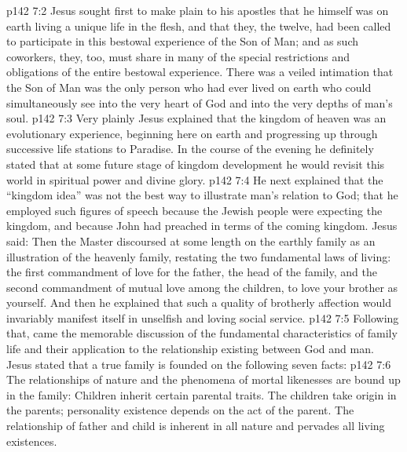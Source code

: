 \vs p142 7:2 Jesus sought first to make plain to his apostles that he himself was on earth living a unique life in the flesh, and that they, the twelve, had been called to participate in this bestowal experience of the Son of Man; and as such coworkers, they, too, must share in many of the special restrictions and obligations of the entire bestowal experience. There was a veiled intimation that the Son of Man was the only person who had ever lived on earth who could simultaneously see into the very heart of God and into the very depths of man’s soul.
\vs p142 7:3 Very plainly Jesus explained that the kingdom of heaven was an evolutionary experience, beginning here on earth and progressing up through successive life stations to Paradise. In the course of the evening he definitely stated that at some future stage of kingdom development he would revisit this world in spiritual power and divine glory.
\vs p142 7:4 He next explained that the “kingdom idea” was not the best way to illustrate man’s relation to God; that he employed such figures of speech because the Jewish people were expecting the kingdom, and because John had preached in terms of the coming kingdom. Jesus said:  Then the Master discoursed at some length on the earthly family as an illustration of the heavenly family, restating the two fundamental laws of living: the first commandment of love for the father, the head of the family, and the second commandment of mutual love among the children, to love your brother as yourself. And then he explained that such a quality of brotherly affection would invariably manifest itself in unselfish and loving social service.
\vs p142 7:5 Following that, came the memorable discussion of the fundamental characteristics of family life and their application to the relationship existing between God and man. Jesus stated that a true family is founded on the following seven facts:
\vs p142 7:6 \bibnobreakspace {} The relationships of nature and the phenomena of mortal likenesses are bound up in the family: Children inherit certain parental traits. The children take origin in the parents; personality existence depends on the act of the parent. The relationship of father and child is inherent in all nature and pervades all living existences.
